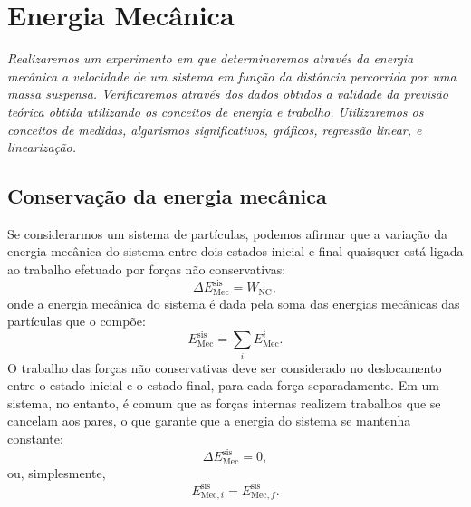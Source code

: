 \chapter{Energia Mecânica} %
\label{Chap:NomeDoExp}        %

\begin{fullwidth}\it
Realizaremos um experimento em que determinaremos através da energia mecânica a velocidade de um sistema em função da distância percorrida por uma massa suspensa. Verificaremos através dos dados obtidos a validade da previsão teórica obtida utilizando os conceitos de energia e trabalho. Utilizaremos os conceitos de medidas, algarismos significativos, gráficos, regressão linear, e linearização.
\end{fullwidth}

\section{Conservação da energia mecânica}

Se considerarmos um sistema de partículas, podemos afirmar que a variação da energia mecânica do sistema entre dois estados inicial e final quaisquer está ligada ao trabalho efetuado por forças não conservativas:
\begin{equation}\label{Eq:VariacaoEnergiaMecanica}
    \Delta E_{\text{Mec}}^{\text{sis}} = W_{\text{NC}},
\end{equation}
%
onde a energia mecânica do sistema é dada pela soma das energias mecânicas das partículas que o compõe:
\begin{equation}
    E_{\text{Mec}}^{\text{sis}} = \sum_{i} E_{\text{Mec}}^i.
\end{equation}
%
O trabalho das forças não conservativas deve ser considerado no deslocamento entre o estado inicial e o estado final, para cada força separadamente. Em um sistema, no entanto, é comum que as forças internas realizem trabalhos que se cancelam aos pares, o que garante que a energia do sistema se mantenha constante:
\begin{equation}
    \Delta E_{\text{Mec}}^{\text{sis}} = 0,
\end{equation}
%
ou, simplesmente,
\begin{equation}
    E_{\text{Mec},i}^{\text{sis}} = E_{\text{Mec},f}^{\text{sis}}.
\end{equation}

